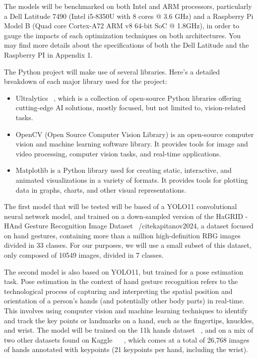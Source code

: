 \documentclass[12pt]{article}
\begin{document}
The models will be benchmarked on both Intel and ARM processors, particularly a Dell Latitude 7490 (Intel i5-8350U with 8 cores @ 3.6 GHz) and a Raspberry Pi Model B (Quad core Cortex-A72 ARM v8 64-bit SoC @ 1.8GHz), in order to gauge the impacts of each optimization techniques on both architectures. You may find more details about the specifications of both the Dell Latitude and the Raspberry PI in Appendix 1.

The Python project will make use of several libraries. Here's a detailed breakdown of each major library used for the project:
\begin{itemize}
  \item Ultralytics ~\cite{ultralytics}, which is a collection of open-source Python libraries offering cutting-edge AI solutions, mostly focused, but not limited to, vision-related tasks.
  \item OpenCV (Open Source Computer Vision Library) is an open-source computer vision and machine learning software library. It provides tools for image and video processing, computer vision tasks, and real-time applications.
  \item Matplotlib is a Python library used for creating static, interactive, and animated visualizations in a variety of formats. It provides tools for plotting data in graphs, charts, and other visual representations.
\end{itemize}

The first model that will be tested will be based of a YOLO11 convolutional neural network model, and trained on a down-sampled version of the HaGRID - HAnd Gesture Recognition Image Dataset ~/cite{kapitanov2024}, a dataset focused on hand gestures, containing more than a million high-definition RBG images divided in 33 classes. For our purposes, we will use a small subset of this dataset, only composed of 10549 images, divided in 7 classes.

The second model is also based on YOLO11, but trained for a pose estimation task. Pose estimation in the context of hand gesture recognition refers to the technological process of capturing and interpreting the spatial position and orientation of a person's hands (and potentially other body parts) in real-time. This involves using computer vision and machine learning techniques to identify and track the key points or landmarks on a hand, such as the fingertips, knuckles, and wrist. The model will be trained on the 11k hands dataset ~\cite{afifi201911kHands}, and on a mix of two other datasets found on Kaggle ~\cite{rikitagiridhar} ~\cite{imsparsh}, which comes at a total of 26,768 images of hands annotated with keypoints (21 keypoints per hand, including the wrist).
\end{document}
